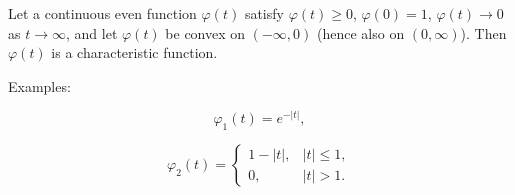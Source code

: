 Let a continuous even function $\varphi(t)$ satisfy $\varphi(t) \geq 0$, $\varphi(0) = 1$, $\varphi(t) \to 0$ as $t \to \infty$, and let $\varphi(t)$ be convex on $(-\infty, 0)$ (hence also on $(0, \infty)$). Then $\varphi(t)$ is a characteristic function.

Examples:

$$\varphi_1(t) = e^{-|t|},$$

$$\varphi_2(t) = \begin{cases} 1 - |t|, & |t| \leq 1, \\ 0, & |t| > 1. \end{cases}$$
